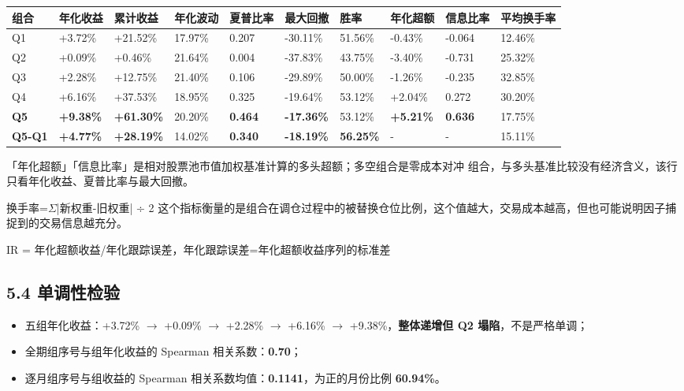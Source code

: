 \documentclass[UTF8,a4paper,11pt]{ctexart}
\begin{document}
\begin{table}[htbp]
\centering
\footnotesize
\begin{tabularx}{\textwidth}{@{}YYYYYYYYYY@{}}
\toprule
组合 & 年化收益 & 累计收益 & 年化波动 & 夏普比率 & 最大回撤 & 胜率 & 年化超额 & 信息比率 & 平均换手率 \\
\midrule
Q1 & +3.72\% & +21.52\% & 17.97\% & 0.207 & -30.11\% & 51.56\% & -0.43\% & -0.064 & 12.46\% \\
Q2 & +0.09\% & +0.46\% & 21.64\% & 0.004 & -37.83\% & 43.75\% & -3.40\% & -0.731 & 25.32\% \\
Q3 & +2.28\% & +12.75\% & 21.40\% & 0.106 & -29.89\% & 50.00\% & -1.26\% & -0.235 & 32.85\% \\
Q4 & +6.16\% & +37.53\% & 18.95\% & 0.325 & -19.64\% & 53.12\% & +2.04\% & 0.272 & 30.20\% \\
\textbf{Q5} & \textbf{+9.38\%} & \textbf{+61.30\%} & 20.20\% & \textbf{0.464} & \textbf{-17.36\%} & 53.12\% & \textbf{+5.21\%} & \textbf{0.636} & 17.75\% \\
\textbf{Q5-Q1} & \textbf{+4.77\%} & \textbf{+28.19\%} & 14.02\% & \textbf{0.340} & \textbf{-18.19\%} & \textbf{56.25\%} & - & - & 15.11\% \\
\bottomrule
\end{tabularx}
\end{table}

「年化超额」「信息比率」是相对股票池市值加权基准计算的多头超额；多空组合是零成本对冲
组合，与多头基准比较没有经济含义，该行只看年化收益、夏普比率与最大回撤。

换手率=$\Sigma$|新权重-旧权重| ÷ 2  这个指标衡量的是组合在调仓过程中的被替换仓位比例，这个值越大，交易成本越高，但也可能说明因子捕捉到的交易信息越充分。

IR = 年化超额收益/年化跟踪误差，年化跟踪误差=年化超额收益序列的标准差

{}
\subsection*{5.4 单调性检验}

\begin{itemize}[leftmargin=2em,itemsep=2pt,topsep=3pt]
\item 
五组年化收益：+3.72\% $\rightarrow$ +0.09\% $\rightarrow$ +2.28\% $\rightarrow$ +6.16\% $\rightarrow$ +9.38\%，\textbf{整体递增但 Q2 塌陷}，不是严格单调；

\item 
全期组序号与组年化收益的 Spearman 相关系数：\textbf{0.70}；

\item 
逐月组序号与组收益的 Spearman 相关系数均值：\textbf{0.1141}，为正的月份比例 \textbf{60.94\%}。

\end{itemize}
\end{document}
